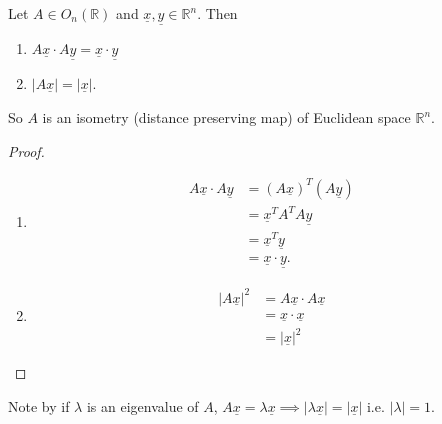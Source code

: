 \begin{lemma}\label{lem:20}
    Let $A \in O_n(\mathbb{R})$ and $\underline{x}, \underline{y} \in \mathbb{R}^n$. Then
    \begin{enumerate}
        \item $A \underline{x} \cdot A \underline{y} = \underline{x} \cdot \underline{y}$
        \item $|A \underline{x}| = |\underline{x}|$. \label{07-itm-2}
    \end{enumerate} 
    So $A$ is an isometry (distance preserving map) of Euclidean space $\mathbb{R}^n$.
\end{lemma} 

\begin{proof}
    \begin{enumerate}
        \item \begin{align*}
            A \underline{x} \cdot A \underline{y} &= (A \underline{x})^T (A \underline{y}) \\
            &= \underline{x}^T A^T A \underline{y} \\
            &= \underline{x}^T \underline{y} \\
            &= \underline{x} \cdot \underline{y}.
        \end{align*} 
        \item \begin{align*}
            |A \underline{x}|^2 &= A \underline{x} \cdot A \underline{x} \\
            &= \underline{x} \cdot \underline{x} \\
            &= |\underline{x}|^2
        \end{align*} 
    \end{enumerate} 
\end{proof} 

Note by  if $\lambda$ is an eigenvalue of $A$, $A \underline{x} = \lambda \underline{x} \implies |\lambda \underline{x}| = |\underline{x}|$ i.e. $|\lambda| = 1$.

